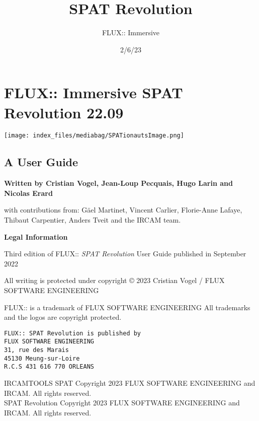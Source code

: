 \documentclass[
  letterpaper,
  DIV=11,
  numbers=noendperiod]{scrreport}
\title{SPAT Revolution}
\author{FLUX:: Immersive}
\date{2/6/23}
\renewcommand*\contentsname{Table of contents}
\newcommand\contentsname{Table of contents}
\begin{document}
\maketitle
\ifdefined\Shaded\renewenvironment{Shaded}{\begin{tcolorbox}[breakable, interior hidden, borderline west={3pt}{0pt}{shadecolor}, enhanced, frame hidden, boxrule=0pt, sharp corners]}{\end{tcolorbox}}\fi

\renewcommand*\contentsname{Table of contents}
{
\hypersetup{linkcolor=}
\setcounter{tocdepth}{2}
\tableofcontents
}

\hypertarget{flux-immersive-spat-revolution-22.09}{%
\chapter{FLUX:: Immersive SPAT Revolution
22.09}\label{flux-immersive-spat-revolution-22.09}}

\texttt{[image: index\_files/mediabag/SPATionautsImage.png]}

\hypertarget{a-user-guide}{%
\section{A User Guide}\label{a-user-guide}}

\textbf{Written by Cristian Vogel, Jean-Loup Pecquais, Hugo Larin and
Nicolas Erard}

with contributions from: Gäel Martinet, Vincent Carlier, Florie-Anne
Lafaye, Thibaut Carpentier, Anders Tveit and the IRCAM team.

\textbf{Legal Information}

Third edition of FLUX:: \emph{SPAT Revolution} User Guide published in
September 2022

All writing is protected under copyright © 2023 Cristian Vogel / FLUX
SOFTWARE ENGINEERING

FLUX:: is a trademark of FLUX SOFTWARE ENGINEERING All trademarks and
the logos are copyright protected.

\begin{verbatim}
FLUX:: SPAT Revolution is published by
FLUX SOFTWARE ENGINEERING
31, rue des Marais
45130 Meung-sur-Loire
R.C.S 431 616 770 ORLEANS
\end{verbatim}

IRCAMTOOLS SPAT Copyright 2023 FLUX SOFTWARE ENGINEERING and IRCAM. All
rights reserved.\\
SPAT Revolution Copyright 2023 FLUX SOFTWARE ENGINEERING and IRCAM. All
rights reserved.
\end{document}
